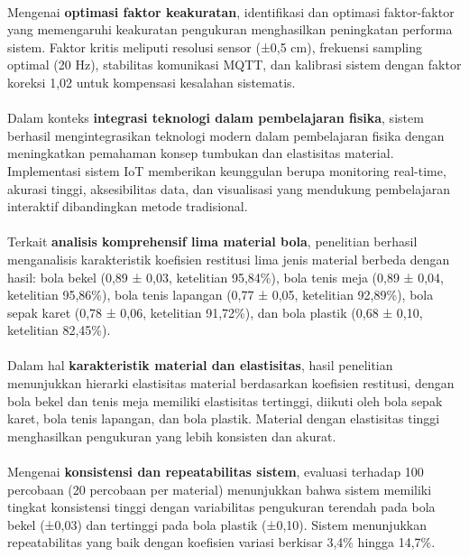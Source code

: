 \paragraph{}Mengenai \textbf{optimasi faktor keakuratan}, identifikasi dan optimasi faktor-faktor yang memengaruhi keakuratan pengukuran menghasilkan peningkatan performa sistem. Faktor kritis meliputi resolusi sensor (±0,5 cm), frekuensi sampling optimal (20 Hz), stabilitas komunikasi MQTT, dan kalibrasi sistem dengan faktor koreksi 1,02 untuk kompensasi kesalahan sistematis.

\paragraph{}Dalam konteks \textbf{integrasi teknologi dalam pembelajaran fisika}, sistem berhasil mengintegrasikan teknologi modern dalam pembelajaran fisika dengan meningkatkan pemahaman konsep tumbukan dan elastisitas material. Implementasi sistem IoT memberikan keunggulan berupa monitoring real-time, akurasi tinggi, aksesibilitas data, dan visualisasi yang mendukung pembelajaran interaktif dibandingkan metode tradisional.

\paragraph{}Terkait \textbf{analisis komprehensif lima material bola}, penelitian berhasil menganalisis karakteristik koefisien restitusi lima jenis material berbeda dengan hasil: bola bekel (0,89 ± 0,03, ketelitian 95,84\%), bola tenis meja (0,89 ± 0,04, ketelitian 95,86\%), bola tenis lapangan (0,77 ± 0,05, ketelitian 92,89\%), bola sepak karet (0,78 ± 0,06, ketelitian 91,72\%), dan bola plastik (0,68 ± 0,10, ketelitian 82,45\%).

\paragraph{}Dalam hal \textbf{karakteristik material dan elastisitas}, hasil penelitian menunjukkan hierarki elastisitas material berdasarkan koefisien restitusi, dengan bola bekel dan tenis meja memiliki elastisitas tertinggi, diikuti oleh bola sepak karet, bola tenis lapangan, dan bola plastik. Material dengan elastisitas tinggi menghasilkan pengukuran yang lebih konsisten dan akurat.

\paragraph{}Mengenai \textbf{konsistensi dan repeatabilitas sistem}, evaluasi terhadap 100 percobaan (20 percobaan per material) menunjukkan bahwa sistem memiliki tingkat konsistensi tinggi dengan variabilitas pengukuran terendah pada bola bekel (±0,03) dan tertinggi pada bola plastik (±0,10). Sistem menunjukkan repeatabilitas yang baik dengan koefisien variasi berkisar 3,4\% hingga 14,7\%.

